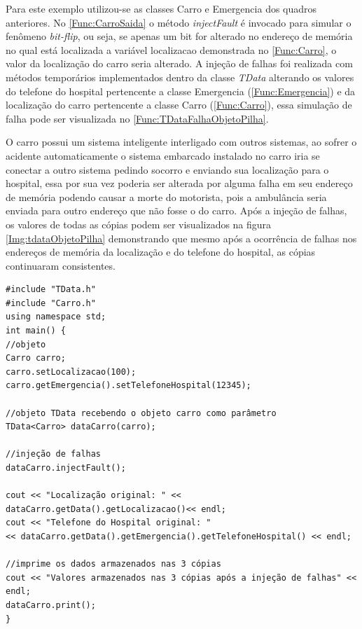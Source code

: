 Para este exemplo utilizou-se as classes Carro e Emergencia dos quadros anteriores. No \autoref{Func:CarroSaida} o método \textit{injectFault} é invocado para simular o fenômeno \textit{bit-flip}, ou seja, se apenas um bit for alterado no endereço de memória no qual está localizada a variável localizacao demonstrada no \autoref{Func:Carro}, o valor da localização do carro seria alterado. A injeção de falhas foi realizada com métodos temporários implementados dentro da classe \textit{TData} alterando os valores do telefone do hospital pertencente a classe Emergencia (\autoref{Func:Emergencia}) e da localização do carro pertencente a classe Carro (\autoref{Func:Carro}), essa simulação de falha pode ser visualizada no \autoref{Func:TDataFalhaObjetoPilha}. 

O carro possui um sistema inteligente interligado com outros sistemas, ao sofrer o acidente automaticamente o sistema embarcado instalado no carro iria se conectar a outro sistema pedindo socorro e enviando sua localização para o hospital, essa por sua vez poderia ser alterada por alguma falha em seu endereço de memória podendo causar a morte do motorista, pois a ambulância seria enviada para outro endereço que não fosse o do carro. Após a injeção de falhas, os valores  de todas as cópias podem ser visualizados na figura \ref{Img:tdataObjetoPilha} demonstrando que mesmo após a ocorrência de falhas nos endereços de memória da localização e do telefone do hospital, as cópias continuaram consistentes.

\begin{lstlisting}[label=Func:CarroSaida,caption={[Método que demonstra integridade dos dados de localização do veículo após a injeção de falhas.] Neste quadro é mostrado o  método main(), que após ser executado, mostra os dados de localização do veículo íntegros após a injeção de falhas.}]
#include "TData.h"
#include "Carro.h"
using namespace std;
int main() {
//objeto
Carro carro;
carro.setLocalizacao(100);
carro.getEmergencia().setTelefoneHospital(12345);

//objeto TData recebendo o objeto carro como parâmetro
TData<Carro> dataCarro(carro);

//injeção de falhas
dataCarro.injectFault();

cout << "Localização original: " << dataCarro.getData().getLocalizacao()<< endl;
cout << "Telefone do Hospital original: "
<< dataCarro.getData().getEmergencia().getTelefoneHospital() << endl;

//imprime os dados armazenados nas 3 cópias
cout << "Valores armazenados nas 3 cópias após a injeção de falhas" << endl;
dataCarro.print();
}
\end{lstlisting}

